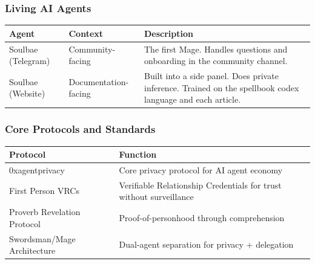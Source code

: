 \documentclass[
]{article}
\newcounter{none} %
\begin{document}
\subsubsection{Living AI Agents}\label{living-ai-agents}

{\def\LTcaptype{none} %
\begin{longtable}[]{@{}
  >{\raggedright\arraybackslash}p{}
  >{\raggedright\arraybackslash}p{}
  >{\raggedright\arraybackslash}p{}@{}}
\toprule\noalign{}
\begin{minipage}[b]{\linewidth}\raggedright
Agent
\end{minipage} & \begin{minipage}[b]{\linewidth}\raggedright
Context
\end{minipage} & \begin{minipage}[b]{\linewidth}\raggedright
Description
\end{minipage} \\
\midrule\noalign{}
\endhead
\bottomrule\noalign{}
\endlastfoot
Soulbae (Telegram) & Community-facing & The first Mage. Handles
questions and onboarding in the community channel. \\
Soulbae (Website) & Documentation-facing & Built into a side panel. Does
private inference. Trained on the spellbook codex language and each
article. \\
\end{longtable}
}

\subsubsection{Core Protocols and
Standards}\label{core-protocols-and-standards}

{\def\LTcaptype{none} %
\begin{longtable}[]{@{}
  >{\raggedright\arraybackslash}p{}
  >{\raggedright\arraybackslash}p{}@{}}
\toprule\noalign{}
\begin{minipage}[b]{\linewidth}\raggedright
Protocol
\end{minipage} & \begin{minipage}[b]{\linewidth}\raggedright
Function
\end{minipage} \\
\midrule\noalign{}
\endhead
\bottomrule\noalign{}
\endlastfoot
0xagentprivacy & Core privacy protocol for AI agent economy \\
First Person VRCs & Verifiable Relationship Credentials for trust
without surveillance \\
Proverb Revelation Protocol & Proof-of-personhood through
comprehension \\
Swordsman/Mage Architecture & Dual-agent separation for privacy +
delegation \\
\end{longtable}
}
\end{document}
